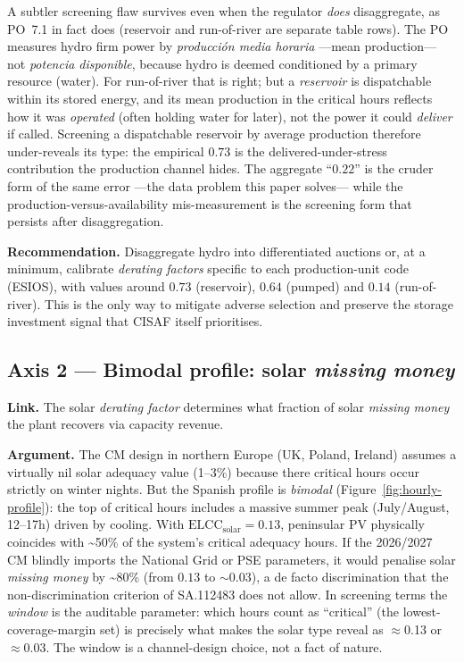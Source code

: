 \documentclass[11pt,a4paper]{article}
\begin{document}
A subtler screening flaw survives even when the regulator \emph{does} disaggregate, as
PO~7.1 in fact does (reservoir and run-of-river are separate table rows). The PO
measures hydro firm power by \emph{producci\'on media horaria} ---mean production---
not \emph{potencia disponible}, because hydro is deemed conditioned by a primary
resource (water). For run-of-river that is right; but a \emph{reservoir} is
dispatchable within its stored energy, and its mean production in the critical hours
reflects how it was \emph{operated} (often holding water for later), not the power it
could \emph{deliver} if called. Screening a dispatchable reservoir by average
production therefore under-reveals its type: the empirical $0.73$ is the
delivered-under-stress contribution the production channel hides. The aggregate
``$0.22$'' is the cruder form of the same error ---the data problem this paper
solves--- while the production-versus-availability mis-measurement is the screening
form that persists after disaggregation.

\textbf{Recommendation.} Disaggregate hydro into differentiated auctions or, at a
minimum, calibrate \emph{derating factors} specific to each production-unit code
(ESIOS), with values around $0.73$ (reservoir), $0.64$ (pumped) and $0.14$
(run-of-river). This is the only way to mitigate adverse selection and preserve the
storage investment signal that CISAF itself prioritises.

\subsection{Axis 2 --- Bimodal profile: solar \emph{missing money}}
\label{sec:eje2}

\textbf{Link.} The solar \emph{derating factor} determines what fraction of solar
\emph{missing money} the plant recovers via capacity revenue.

\textbf{Argument.} The CM design in northern Europe (UK, Poland, Ireland)
assumes a virtually nil solar adequacy value (1--3\%) because there critical hours
occur strictly on winter nights. But the Spanish profile is \emph{bimodal}
(Figure~\ref{fig:hourly-profile}): the top of critical hours includes a massive
summer peak (July/August, 12--17h) driven by cooling. With
$\text{ELCC}_{\text{solar}}=0.13$, peninsular PV physically coincides with
\textasciitilde50\% of the system's critical adequacy hours. If the 2026/2027 CM blindly
imports the National Grid or PSE parameters, it would penalise solar \emph{missing
money} by \textasciitilde80\% (from $0.13$ to $\sim$0.03), a de facto
discrimination that the non-discrimination criterion of SA.112483
\citep{ec2026sa112483} does not allow. In screening terms the \emph{window} is the
auditable parameter: which hours count as ``critical'' (the lowest-coverage-margin set)
is precisely what makes the solar type reveal as $\approx$0.13 or $\approx$0.03. The
window is a channel-design choice, not a fact of nature.
\end{document}
